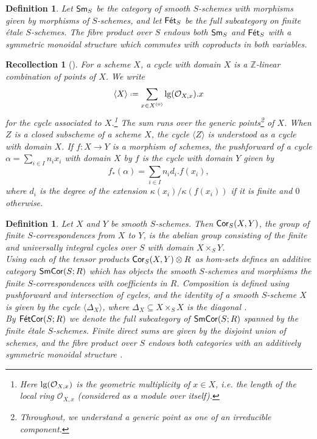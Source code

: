 \documentclass[reqno]{amsart}
\numberwithin{equation}{section}\theoremstyle{thms}
\theoremstyle{defn}
\newtheorem{defi}[equation]{Definition}
\newtheorem{rec}[equation]{Recollection}
\newcommand{\bZ}{\mathbb{Z}}
\newcommand{\cO}{\mathcal{O}}
\newcommand{\tn}[1]{\textnormal{#1}}
\newcommand{\tsf}[1]{\textsf{\textup{#1}}}
\newcommand*{\defeq}{\mathrel{\vcenter{\baselineskip0.4ex \lineskiplimit0pt
\hbox{\scriptsize.}\hbox{\scriptsize.}}}%
=}
\newcommand{\sms}{\tsf{Sm}_S}
\newcommand{\fets}{\tsf{Fét}_S}
\newcommand{\corsms}[1]{\tsf{SmCor}(S;#1)}
\newcommand{\corfets}[1]{\tsf{FétCor}(S;#1)}
\begin{document}
\begin{defi}
Let $\sms$ be the category of smooth $S$-schemes with morphisms given by morphisms of $S$-schemes, and let $\fets$ be the full subcategory on finite étale $S$-schemes. The fibre product over $S$ endows both $\sms$ and $\fets$ with a symmetric monoidal structure which commutes with coproducts in both variables. 
\end{defi}

\begin{rec}[{\cite[§8.1.a]{cd19}}]\label{rec:cycles}
For a scheme $X$, a \emph{cycle with domain $X$} is a $\bZ$-linear combination of points of $X$. We write 
$$\langle X \rangle \defeq \sum_{x \in X^{(0)}} \tn{lg}(\cO_{X,x}).x$$ 
for the \emph{cycle associated to $X$}.\footnote{Here $\tn{lg}(\cO_{X,x})$ is the geometric multiplicity of $x \in X$, i.e. the length of the local ring $\cO_{X,x}$ (considered as a module over itself).} The sum runs over the generic points\footnote{Throughout, we understand a generic point as one of an irreducible component.} of $X$. When $Z$ is a closed subscheme of a scheme $X$, the cycle $\langle Z \rangle$ is understood as a cycle with domain $X$. If $f: X \to Y$ is a morphism of schemes, the \emph{pushforward} of a cycle $\alpha=\sum_{i \in I} n_ix_i$ with domain $X$ by $f$ is the cycle with domain $Y$ given by 
$$f_*(\alpha) = \sum_{i \in I} n_id_i.f(x_i),$$
where $d_i$ is the degree of the extension $\kappa(x_i)/\kappa(f(x_i))$ if it is finite and $0$ otherwise. 
\end{rec}

\begin{defi}\label{defi:correspondence}
Let $X$ and $Y$ be smooth $S$-schemes. Then $\tsf{Cor}_S(X,Y)$, the group of \emph{finite $S$-correspondences from $X$ to $Y$}, is the abelian group consisting of the finite and universally integral cycles over $S$ with domain $X \times_S Y$. \\
Using each of the tensor products $\tsf{Cor}_S(X,Y) \otimes R$ as hom-sets defines an additive category $\corsms{R}$ which has objects the smooth $S$-schemes and morphisms the finite $S$-correspondences with coefficients in $R$. Composition is defined using pushforward and intersection of cycles, and the identity of a smooth $S$-scheme $X$ is given by the cycle $\langle \Delta_X \rangle$, where $\Delta_X \subseteq X\times_S X$ is the diagonal \cite[§9.1]{cd19}. \\
By $\corfets{R}$ we denote the full subcategory of $\corsms{R}$ spanned by the finite étale $S$-schemes. Finite direct sums are given by the disjoint union of schemes, and the fibre product over $S$ endows both categories with an additively symmetric monoidal structure \cite[§9.2]{cd19}.
\end{defi}
\end{document}
